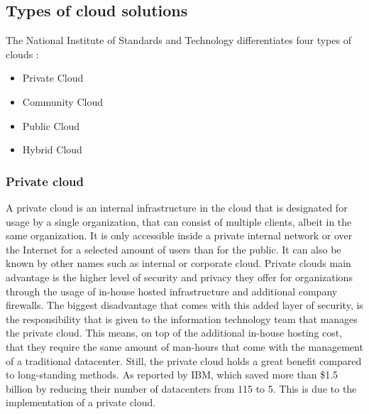 \subsection{Types of cloud solutions}

The National Institute of Standards and Technology differentiates four types of clouds \autocite{Mell2011}:
\begin{itemize}
	\item Private Cloud
	\item Community Cloud
	\item Public Cloud
	\item Hybrid Cloud
\end{itemize}	


\subsubsection{Private cloud}
A private cloud is an internal infrastructure in the cloud that is designated for usage by a single organization, that can consist of multiple clients, albeit in the same organization. It is only accessible inside a private internal network or over the Internet for a selected amount of users than for the public. It can also be known by other names such as internal or corporate cloud. Private clouds main advantage is the higher level of security and privacy they offer for organizations through the usage of in-house hosted infrastructure and additional company firewalls. The biggest disadvantage that comes with this added layer of security, is the responsibility that is given to the information technology team that manages the private cloud. This means, on top of the additional in-house hosting cost, that they require the same amount of man-hours that come with the management of a traditional datacenter. 
Still, the private cloud holds a great benefit compared to long-standing methods. As reported by IBM, which saved more than \$1.5 billion by reducing their number of datacenters from 115 to 5. This is due to the implementation of a private cloud. \autocite{Hofmann2010} 


